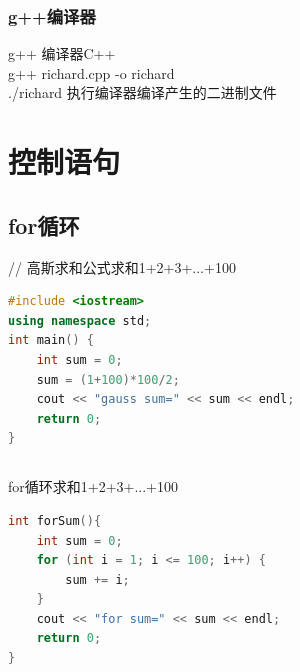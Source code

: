 \documentclass[12pt,twiside,a4paper]{ctexbook}
\numberwithin{chapter}{part}
\begin{document}
\subsection{g++编译器}
g++ 编译器C++\\
g++ richard.cpp -o richard\\
./richard 执行编译器编译产生的二进制文件

\chapter{控制语句}
\section{for循环}
// 高斯求和公式求和1+2+3+...+100
\begin{lstlisting}[language=C++]
#include <iostream>
using namespace std;
int main() {
    int sum = 0;
    sum = (1+100)*100/2;
    cout << "gauss sum=" << sum << endl;
    return 0;
}
\end{lstlisting}

\section{}
for循环求和1+2+3+...+100\\
\begin{lstlisting}[language=C++]
int forSum(){
    int sum = 0;
    for (int i = 1; i <= 100; i++) {
        sum += i;
    }
    cout << "for sum=" << sum << endl;
    return 0;
}
\end{lstlisting}
\end{document}
